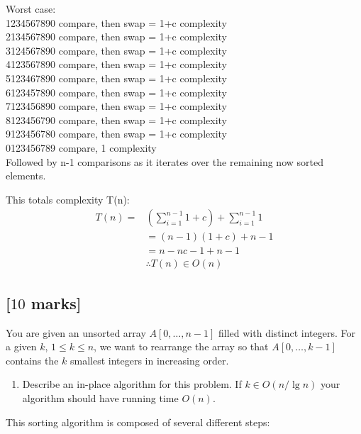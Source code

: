 \documentclass[12pt]{article}
\begin{document}
  Worst case:\\
  1234567890 compare, then swap = 1+c complexity\\
  2134567890 compare, then swap = 1+c complexity\\
  3124567890 compare, then swap = 1+c complexity\\
  4123567890 compare, then swap = 1+c complexity\\
  5123467890 compare, then swap = 1+c complexity\\
  6123457890 compare, then swap = 1+c complexity\\
  7123456890 compare, then swap = 1+c complexity\\
  8123456790 compare, then swap = 1+c complexity\\
  9123456780 compare, then swap = 1+c complexity\\
  0123456789 compare, 1 complexity\\

  Followed by n-1 comparisons as it iterates over the remaining now sorted elements.

  This totals complexity T(n):\\

  \begin{align*}
    T(n)=&(\sum_{i=1}^{n-1} 1 + c) + \sum_{i=1}^{n-1} 1\\
    &=(n-1)(1+c) + n-1\\
    &=n - nc - 1 + n -1\\
    &\therefore T(n) \in O(n)
  \end{align*}

\subsection{[$10$ marks]}

You are given an unsorted array $A [0, \ldots, n - 1]$ filled with distinct
integers. For a given $k$, $1 \leq k \leq n$, we want to rearrange the array
so that $A [0, \ldots, k - 1]$ contains the $k$ smallest integers in
increasing order.
\begin{enumerate}
  \item Describe an in-place algorithm for this problem. If $k \in O (n / \lg
  n)$ your algorithm should have running time $O (n)$.
\end{enumerate}

This sorting algorithm is composed of several different steps:
\end{document}
